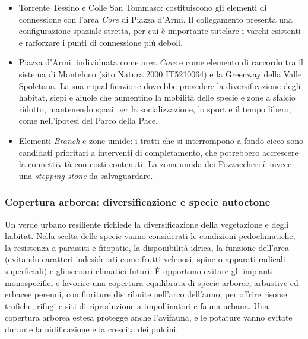\documentclass[
  a4paper,
]{book}
\providecommand{\tightlist}{%
  \setlength{\itemsep}{0pt}\setlength{\parskip}{0pt}}
\begin{document}
\begin{itemize}
\tightlist
\item
  Torrente Tessino e Colle San Tommaso: costituiscono gli elementi di connessione con l'area \emph{Core} di Piazza d'Armi. Il collegamento presenta una configurazione spaziale stretta, per cui è importante tutelare i varchi esistenti e rafforzare i punti di connessione più deboli.
\item
  Piazza d'Armi: individuata come area \emph{Core} e come elemento di raccordo tra il sistema di Monteluco (sito Natura 2000 IT5210064) e la Greenway della Valle Spoletana. La sua riqualificazione dovrebbe prevedere la diversificazione degli habitat, siepi e aiuole che aumentino la mobilità delle specie e zone a sfalcio ridotto, mantenendo spazi per la socializzazione, lo sport e il tempo libero, come nell'ipotesi del Parco della Pace.
\item
  Elementi \emph{Branch} e zone umide: i tratti che si interrompono a fondo cieco sono candidati prioritari a interventi di completamento, che potrebbero accrescere la connettività con costi contenuti. La zona umida dei Pozzaccheri è invece una \emph{stepping stone} da salvaguardare.
\end{itemize}

\subsubsection{Copertura arborea: diversificazione e specie autoctone}\label{copertura-arborea-diversificazione-e-specie-autoctone}

Un verde urbano resiliente richiede la diversificazione della vegetazione e degli habitat.
Nella scelta delle specie vanno considerati le condizioni pedoclimatiche, la resistenza a parassiti e fitopatie, la disponibilità idrica, la funzione dell'area (evitando caratteri indesiderati come frutti velenosi, spine o apparati radicali superficiali) e gli scenari climatici futuri.
È opportuno evitare gli impianti monospecifici e favorire una copertura equilibrata di specie arboree, arbustive ed erbacee perenni, con fioriture distribuite nell'arco dell'anno, per offrire risorse trofiche, rifugi e siti di riproduzione a impollinatori e fauna urbana.
Una copertura arborea estesa protegge anche l'avifauna, e le potature vanno evitate durante la nidificazione e la crescita dei pulcini.
\end{document}
